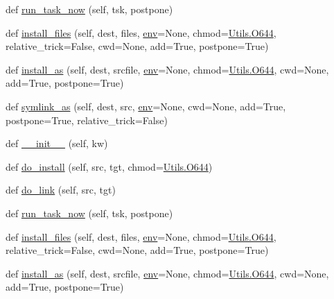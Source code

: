 \begin{DoxyCompactItemize}
def \hyperlink{classwaflib_1_1_build_1_1_install_context_ab9691686f803c54151ec5bbc92717a0f}{run\+\_\+task\+\_\+now} (self, tsk, postpone)
\item 
def \hyperlink{classwaflib_1_1_build_1_1_install_context_af07f1f67998c0f4a6d20361cd28ee0bc}{install\+\_\+files} (self, dest, files, \hyperlink{classwaflib_1_1_build_1_1_build_context_ac3b464a969bc6c898c739b6d820b2219}{env}=None, chmod=\hyperlink{namespacewaflib_1_1_utils_ade9dd27fadbf52a0641bbff06d3dd3ac}{Utils.\+O644}, relative\+\_\+trick=False, cwd=None, add=True, postpone=True)
\item 
def \hyperlink{classwaflib_1_1_build_1_1_install_context_a7a653c97bec879bfd813d525c8c0caf3}{install\+\_\+as} (self, dest, srcfile, \hyperlink{classwaflib_1_1_build_1_1_build_context_ac3b464a969bc6c898c739b6d820b2219}{env}=None, chmod=\hyperlink{namespacewaflib_1_1_utils_ade9dd27fadbf52a0641bbff06d3dd3ac}{Utils.\+O644}, cwd=None, add=True, postpone=True)
\item 
def \hyperlink{classwaflib_1_1_build_1_1_install_context_a25a3977cdde84cb8b06ce8316acc686b}{symlink\+\_\+as} (self, dest, src, \hyperlink{classwaflib_1_1_build_1_1_build_context_ac3b464a969bc6c898c739b6d820b2219}{env}=None, cwd=None, add=True, postpone=True, relative\+\_\+trick=False)
\item 
def \hyperlink{classwaflib_1_1_build_1_1_install_context_a92d1f07459687e8da5a0e871eeb462f0}{\+\_\+\+\_\+init\+\_\+\+\_\+} (self, kw)
\item 
def \hyperlink{classwaflib_1_1_build_1_1_install_context_a389ce541ae521e6e4e616cfddf89bd7e}{do\+\_\+install} (self, src, tgt, chmod=\hyperlink{namespacewaflib_1_1_utils_ade9dd27fadbf52a0641bbff06d3dd3ac}{Utils.\+O644})
\item 
def \hyperlink{classwaflib_1_1_build_1_1_install_context_ac012afc7dd8fb657141d28ad571392f4}{do\+\_\+link} (self, src, tgt)
\item 
def \hyperlink{classwaflib_1_1_build_1_1_install_context_ab9691686f803c54151ec5bbc92717a0f}{run\+\_\+task\+\_\+now} (self, tsk, postpone)
\item 
def \hyperlink{classwaflib_1_1_build_1_1_install_context_af07f1f67998c0f4a6d20361cd28ee0bc}{install\+\_\+files} (self, dest, files, \hyperlink{classwaflib_1_1_build_1_1_build_context_ac3b464a969bc6c898c739b6d820b2219}{env}=None, chmod=\hyperlink{namespacewaflib_1_1_utils_ade9dd27fadbf52a0641bbff06d3dd3ac}{Utils.\+O644}, relative\+\_\+trick=False, cwd=None, add=True, postpone=True)
\item 
def \hyperlink{classwaflib_1_1_build_1_1_install_context_a7a653c97bec879bfd813d525c8c0caf3}{install\+\_\+as} (self, dest, srcfile, \hyperlink{classwaflib_1_1_build_1_1_build_context_ac3b464a969bc6c898c739b6d820b2219}{env}=None, chmod=\hyperlink{namespacewaflib_1_1_utils_ade9dd27fadbf52a0641bbff06d3dd3ac}{Utils.\+O644}, cwd=None, add=True, postpone=True)

\end{DoxyCompactItemize}
